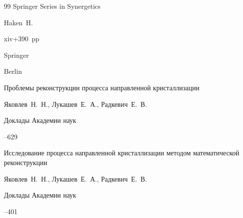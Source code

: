 \begin{thebibliography}{99}
\serial Springer Series in Synergetics


\by Haken~H.

\totalpages xiv+390~pp \nofrills


\publaddr Springer

\publ Berlin






\paper Проблемы реконструкции процесса направленной кристаллизации

\by Яковлев~Н.~Н., Лукашев~Е.~А., Радкевич~Е.~В.

\jour Доклады Академии наук




--629














\paper Исследование процесса направленной кристаллизации методом математической реконструкции

\by Яковлев~Н.~Н., Лукашев~Е.~А., Радкевич~Е.~В.

\jour Доклады Академии наук




--401





\end{thebibliography}
